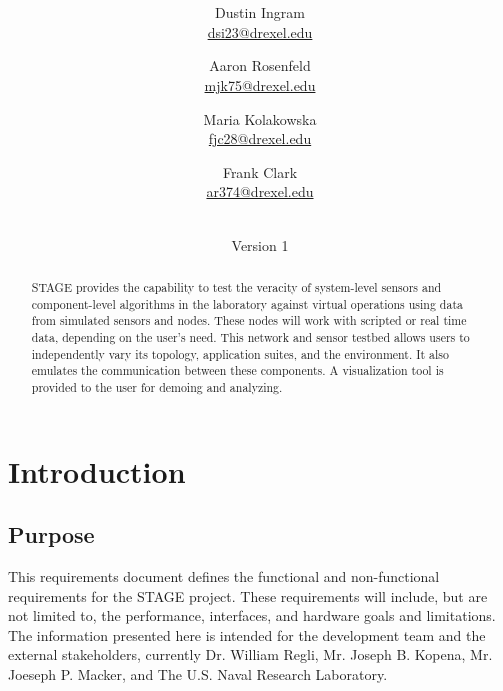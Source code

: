 \documentclass[titlepage]{article}
\title{\textbf{\mytitle}}
\author{
    Dustin Ingram \\\url{dsi23@drexel.edu}
    \and Aaron Rosenfeld \\\url{mjk75@drexel.edu}
    \and Maria Kolakowska \\\url{fjc28@drexel.edu}
    \and Frank Clark \\\url{ar374@drexel.edu}
}
\date{\mydate\\Version 1}
\begin{document}

%

\maketitle

\begin{abstract}
STAGE provides the capability to test the veracity of system-level sensors and component-level algorithms in the laboratory against virtual operations using data from simulated sensors and nodes. These nodes will work with scripted or real time data, depending on the user's need. This network and sensor testbed allows users to independently vary its topology, application suites, and the environment. It also emulates the communication between these components. A visualization tool is provided to the user for demoing and analyzing.
\end{abstract}

\setcounter{tocdepth}{4}
\tableofcontents
\pagebreak
{}



\section{Introduction%
  \label{introduction}%
}


\subsection{Purpose%
  \label{purpose}%
}

This requirements document defines the functional and non-functional requirements for the STAGE project.  These requirements will include, but are not limited to, the performance, interfaces, and hardware goals and limitations.  The information presented here is intended for the development team and the external stakeholders, currently Dr. William Regli, Mr. Joseph B. Kopena, Mr. Joeseph P. Macker, and The U.S. Naval Research Laboratory.
\end{document}
